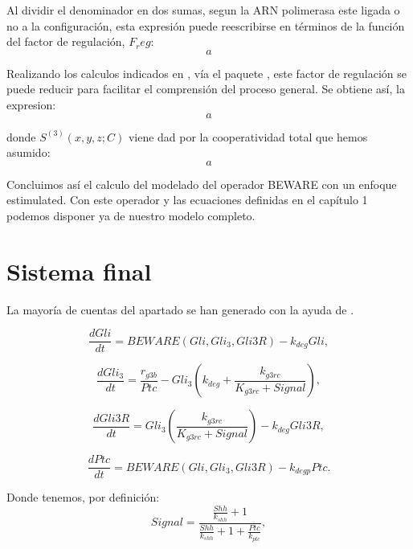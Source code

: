 Al dividir el denominador en dos sumas, segun la ARN polimerasa este ligada o no a la configuración, esta expresión puede reescribirse en términos de la función del factor de regulación, $F_reg$:
\begin{equation}
a
\end{equation}

Realizando los calculos indicados en \cite{cambon1}, vía el paquete \cite{sympy}, este factor de regulación se puede reducir para facilitar el
comprensión del proceso general. Se obtiene así, la expresion:
\begin{equation}
a
\end{equation}

donde $S^{(3)}(x,y,z;C)$ viene dad por la cooperatividad total que hemos asumido:
\begin{equation}
a
\end{equation}

Concluimos así el calculo del modelado del operador BEWARE con un enfoque estimulated. Con este operador y las ecuaciones definidas en el capítulo 1 podemos disponer ya de nuestro modelo completo.

\section{Sistema final}

La mayoría de cuentas del apartado se han generado con la ayuda de \cite{sympy}.

\begin{equation}
\frac{dGli}{dt} = BEWARE(Gli, Gli_3, Gli3R)-k_{deg}Gli,
\label{eq:1}
\end{equation}

\begin{equation}
\frac{dGli_3}{dt} = \frac{r_{g3b}}{Ptc}-Gli_3\left(k_{deg}+\frac{k_{g3rc}}{K_{g3rc}+Signal}\right),
\label{eq:2}
\end{equation}

\begin{equation}
\frac{dGli3R}{dt}= Gli_3\left(\frac{k_{g3rc}}{K_{g3rc}+Signal}\right)-k_{deg}Gli3R,
\label{eq:3}
\end{equation}

\begin{equation}
\frac{dPtc}{dt} = BEWARE(Gli, Gli_3, Gli3R)-k_{degp}Ptc.
\label{eq:4}
\end{equation}


Donde tenemos, por definición:
 \begin{equation}
Signal=\frac{\frac{Shh}{k_{shh}} + 1}{\frac{Shh}{k_{shh}} + 1 + \frac{Ptc}{k_{ptc}}},
\label{signal} \end{equation}

